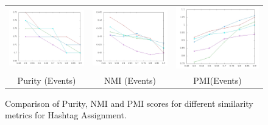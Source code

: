 \documentclass[10pt,a5paper,twoside]{article}
\begin{document}
\begin{figure}[t!]
\begin{center}
{\begin{tabular}{ccc}
		\includegraphics[width=140pt]{Figs/3-1.jpg} & 
		\includegraphics[width=140pt]{Figs/3-2.jpg} & 
		\includegraphics[width=140pt]{Figs/3-3.jpg} \\

		

		{\footnotesize Purity (Events)} & {\footnotesize NMI (Events)} & 
		{\footnotesize PMI(Events)}\\

		

	\end{tabular}
}
\end{center}
\vspace{-4mm}
\caption{\footnotesize Comparison of Purity, NMI and PMI scores for different similarity metrics for Hashtag Assignment.} \label{fig:dist}
\end{figure}




\end{document}
